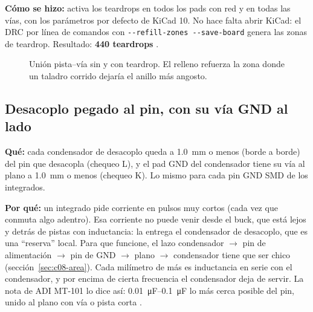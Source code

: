 \textbf{Cómo se hizo:}  activa los teardrops en todos los pads con red y en todas las
vías, con los parámetros por defecto de KiCad 10. No hace falta abrir KiCad: el DRC por línea de comandos con
\texttt{-{}-refill-zones -{}-save-board} genera las zonas de teardrop. Resultado: \textbf{440 teardrops} \medido.

\begin{figure}[htbp]
\centering
{}
\caption{Unión pista--vía sin y con teardrop. El relleno refuerza la zona donde un taladro corrido dejaría el anillo
más angosto.}
\label{fig:c09-teardrop}
\end{figure}

\subsection{Desacoplo pegado al pin, con su vía GND al lado}

\textbf{Qué:} cada condensador de desacoplo queda a \SI{1.0}{\milli\meter} o menos (borde a borde) del pin que desacopla
(chequeo L), y el pad GND del condensador tiene su vía al plano a \SI{1.0}{\milli\meter} o menos (chequeo K). Lo mismo
para cada pin GND SMD de los integrados.

\textbf{Por qué:} un integrado pide corriente en pulsos muy cortos (cada vez que conmuta algo adentro). Esa corriente
no puede venir desde el buck, que está lejos y detrás de pistas con inductancia: la entrega el condensador de
desacoplo, que es una ``reserva'' local. Para que funcione, el lazo condensador $\to$ pin de alimentación $\to$ pin de
GND $\to$ plano $\to$ condensador tiene que ser chico (sección~\ref{sec:c08-area}). Cada milímetro de más es
inductancia en serie con el condensador, y por encima de cierta frecuencia el condensador deja de servir. La nota de
ADI MT-101 lo dice así: \SIrange{0.01}{0.1}{\micro\farad} lo más cerca posible del pin, unido al plano con vía o pista
corta .

